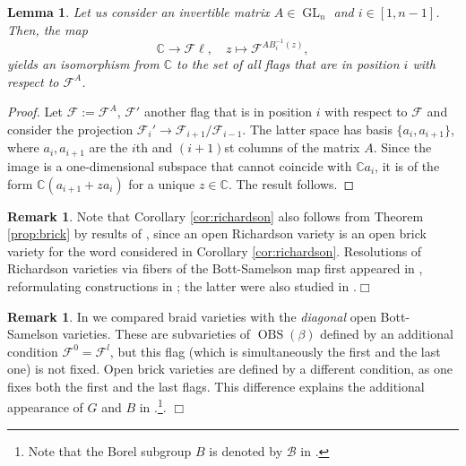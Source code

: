 \documentclass[10pt]{amsart}
\theoremstyle{plain}
\newtheorem{lemma}[thm]{Lemma}
\theoremstyle{definition}
\newtheorem{remark}[thm]{Remark}
\theoremstyle{remark}
\numberwithin{equation}{section}
\newcommand{\lr}{\longrightarrow}
\newcommand{\GL}{\operatorname{GL}}
\newcommand{\bC}{\mathbb{C}}
\newcommand{\cF}{\mathscr{F}}
\newcommand{\Fl}{\mathscr{F}\ell}
\newcommand{\brick}{\operatorname{brick}}
\DeclareMathOperator{\OBS}{OBS}
\newcommand{\MG}[1]{{\color{teal}{{\bf Misha}: #1}}}
\DeclareRobustCommand{\ateb}{\text{\reflectbox{$\beta$}}}
\begin{document}

\begin{lemma}\label{lemma:easy}
	Let us consider an invertible matrix $A \in \GL_{n}$ and $i\in[1,n-1]$. Then, the map
	$$\bC \lr \Fl,\quad z \longmapsto \cF^{AB^{-1}_{i}(z)},$$
	yields an isomorphism from $\bC$ to the set of all flags that are in position $i$ with respect to $\cF^{A}$.
\end{lemma}
\begin{proof}
	Let $\cF := \cF^{A}$, $\cF'$ another flag that is in position $i$ with respect to $\cF$ and consider the projection $\cF_{i}' \lr \cF_{i+1}/\cF_{i-1}$. The latter space has basis $\{a_{i}, a_{i+1}\}$, where $a_{i}, a_{i+1}$ are the $i$th and $(i+1)$st columns of the matrix $A$. Since the image is a one-dimensional subspace that cannot coincide with $\bC a_{i}$, it is of the form $\bC(a_{i+1}+za_{i})$ for a unique $z \in \bC$. The result follows.
\end{proof}

\begin{remark}
Note that Corollary \ref{cor:richardson}  also follows from Theorem \ref{prop:brick} by results of \cite{Escobar}, since an open Richardson variety is an open brick variety for the word considered in Corollary \ref{cor:richardson}. Resolutions of Richardson varieties via fibers of the Bott-Samelson map first appeared in \cite{Balan}, reformulating constructions in \cite{Brion}; the latter were also studied in \cite{KLS2}.\hfill$\Box$
\end{remark}

\begin{remark}
In \cite[Theorem 2.34]{CGGS} we compared braid varieties with the \emph{diagonal} open Bott-Samelson varieties. These are subvarieties of $\OBS(\beta)$ defined by an additional condition $\cF^0 = \cF^l$, but this flag (which is simultaneously the first and the last one) is not fixed. Open brick varieties are defined by a different condition, as one fixes both the first and the last flags. This difference explains the additional appearance of $G$ and $B$ in \cite[Theorem 2.34]{CGGS}.\footnote{Note that the Borel subgroup $B$ is denoted by $\mathcal{B}$ in \cite[Theorem 2.34]{CGGS}.}. %
\hfill$\Box$
\end{remark}
\end{document}
